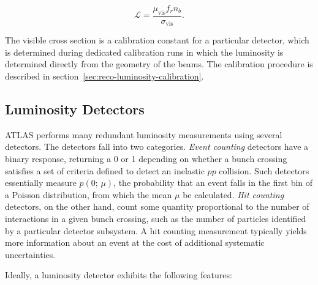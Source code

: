 \begin{equation}\label{eqn:reco-luminosity-detected}
	\mathcal{L} = \frac{\mu_{\mathrm{vis}} f_r n_b}{\sigma_{\mathrm{vis}}}.
\end{equation}

The visible cross section is a calibration constant for a particular detector, which is determined during dedicated calibration runs in which the luminosity is determined directly from the geometry of the beams. The calibration procedure is described in section~\ref{sec:reco-luminosity-calibration}. 

\subsection{Luminosity Detectors}\label{sec:reco-luminosity-detectors}
ATLAS performs many redundant luminosity measurements using several detectors. The detectors fall into two categories. \emph{Event counting} detectors have a binary response, returning a 0 or 1 depending on whether a bunch crossing satisfies a set of criteria defined to detect an inelastic $pp$ collision. Such detectors essentially measure $p(0;\,\mu)$, the probability that an event falls in the first bin of a Poisson distribution, from which the mean $\mu$ be calculated. \emph{Hit counting} detectors, on the other hand, count some quantity proportional to the number of interactions in a given bunch crossing, such as the number of particles identified by a particular detector subsystem. A hit counting measurement typically yields more information about an event at the cost of additional systematic uncertainties.

Ideally, a luminosity detector exhibits the following features: 

